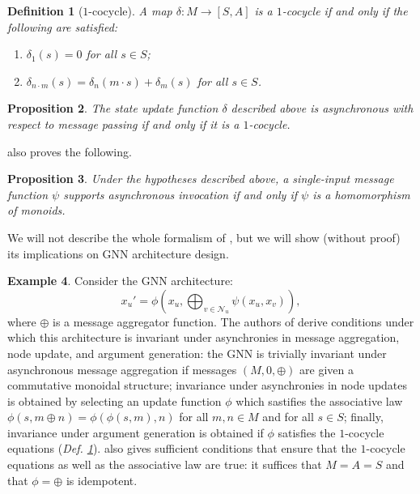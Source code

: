 \documentclass[11pt,a4paper,openright,twoside]{report}
\theoremstyle{plain}
\newtheorem{proposition}{Proposition}
\newtheorem{definition}[proposition]{Definition}
\theoremstyle{definition}
\newtheorem{example}[proposition]{Example}
\begin{document}
\begin{definition}[$1$-cocycle]
  A map $\delta: M \to [S,A]$ is a $1$-cocycle if and only if the following are satisfied:
  \begin{enumerate}
    \item $\delta_1(s) = 0$ for all $s \in S$;
    \item $\delta_{n \cdot m}(s) = \delta_{n}(m \cdot s) + \delta_m(s)$ for all $s \in S$.
  \end{enumerate} 
  \label{def: cocycle}
\end{definition}

\begin{proposition}
  The state update function $\delta$ described above is asynchronous with respect to message passing if and only if it is a $1$-cocycle.
\end{proposition}

\cite{dudzik2024asynchronous} also proves the following.

\begin{proposition}
  Under the hypotheses described above, a single-input message function $\psi$ supports asynchronous invocation if and only if $\psi$ is a homomorphism of monoids.
\end{proposition}

We will not describe the whole formalism of \cite{dudzik2024asynchronous}, but we will show (without proof) its implications on GNN architecture design. 

\begin{example}
  Consider the GNN architecture:
  \[x_u' = \phi\left(x_u, \bigoplus_{v \in \mathcal{N}_u}\psi(x_{u},x_{v})\right),\]
  where $\oplus$ is a message aggregator function. The authors of \cite{dudzik2024asynchronous} derive conditions under which this architecture is invariant under asynchronies in message aggregation, node update, and argument generation: the GNN is trivially invariant under asynchronous message aggregation if messages $(M,0,\oplus)$ are given a commutative monoidal structure; invariance under asynchronies in node updates is obtained by selecting an update function $\phi$ which sastifies the associative law $\phi(s,m \oplus n) = \phi(\phi(s,m),n)$ for all $m,n \in M$ and for all $s \in S$; finally, invariance under argument generation is obtained if $\phi$ satisfies the $1$-cocycle equations (\textit{Def. \ref{def: cocycle}}). \cite{dudzik2024asynchronous} also gives sufficient conditions that ensure that the $1$-cocycle equations as well as the associative law are true: it suffices that $M=A=S$ and that $\phi=\oplus$ is idempotent.
\end{example}
\end{document}
